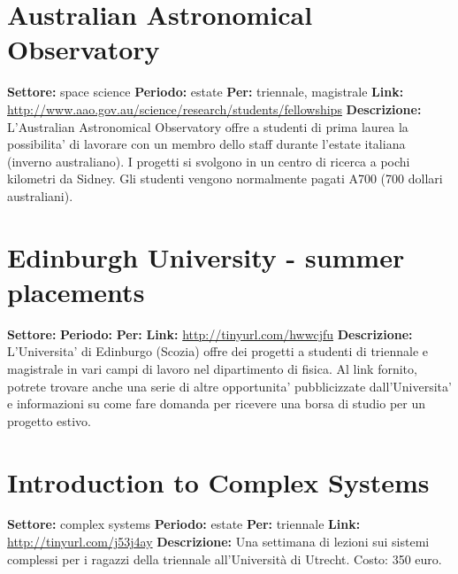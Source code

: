 \documentclass[a4paper,10pt]{article}
\begin{document}
\section{Australian Astronomical Observatory}
\textbf{Settore:} space science \newline
\textbf{Periodo:} estate\newline
\textbf{Per:} triennale, magistrale\newline
\textbf{Link:} \url{http://www.aao.gov.au/science/research/students/fellowships} \newline
\textbf{Descrizione:} L'Australian Astronomical Observatory offre a studenti di prima laurea la possibilita' di lavorare con un membro dello staff durante l'estate italiana (inverno australiano). I progetti si svolgono in un centro di ricerca a pochi kilometri da Sidney. Gli studenti vengono normalmente pagati A700 (700 dollari australiani).   

\section{Edinburgh University - summer placements}
\textbf{Settore:} \newline
\textbf{Periodo:} \newline
\textbf{Per:}\newline
\textbf{Link:} \url{http://tinyurl.com/hwwcjfu} \newline
\textbf{Descrizione:}  L'Universita' di Edinburgo (Scozia) offre dei progetti a studenti di triennale e magistrale in vari campi di lavoro nel dipartimento di fisica. Al link fornito, potrete trovare anche una serie di altre opportunita' pubblicizzate dall'Universita' e informazioni su come fare domanda per ricevere una borsa di studio per un progetto estivo.   

\section{Introduction to Complex Systems}
\textbf{Settore:} complex systems\newline
\textbf{Periodo:} estate\newline
\textbf{Per:} triennale\newline
\textbf{Link:} \url{http://tinyurl.com/j53j4ay} \newline
\textbf{Descrizione:} Una settimana di lezioni sui sistemi complessi per i ragazzi della triennale all'Università di Utrecht. Costo: 350 euro.  
\end{document}
